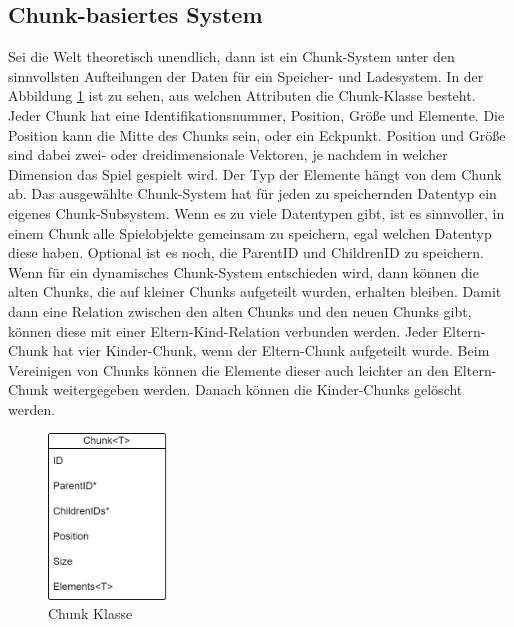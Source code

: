 \subsection{Chunk-basiertes System}
Sei die Welt theoretisch unendlich, dann ist ein Chunk-System unter den sinnvollsten Aufteilungen der Daten für ein Speicher- und Ladesystem. In der Abbildung \ref{fig:chunkClass} ist zu sehen, aus welchen Attributen die Chunk-Klasse besteht. Jeder Chunk hat eine Identifikationsnummer, Position, Größe und Elemente. Die Position kann die Mitte des Chunks sein, oder ein Eckpunkt. Position und Größe sind dabei zwei- oder dreidimensionale Vektoren, je nachdem in welcher Dimension das Spiel gespielt wird. Der Typ der Elemente hängt von dem Chunk ab. Das ausgewählte Chunk-System hat für jeden zu speichernden Datentyp ein eigenes Chunk-Subsystem. Wenn es zu viele Datentypen gibt, ist es sinnvoller, in einem Chunk alle Spielobjekte gemeinsam zu speichern, egal welchen Datentyp diese haben. Optional ist es noch, die ParentID und ChildrenID zu speichern. Wenn für ein dynamisches Chunk-System entschieden wird, dann können die alten Chunks, die auf kleiner Chunks aufgeteilt wurden, erhalten bleiben. Damit dann eine Relation zwischen den alten Chunks und den neuen Chunks gibt, können diese mit einer Eltern-Kind-Relation verbunden werden. Jeder Eltern-Chunk hat vier Kinder-Chunk, wenn der Eltern-Chunk aufgeteilt wurde. Beim Vereinigen von Chunks können die Elemente dieser auch leichter an den Eltern-Chunk weitergegeben werden. Danach können die Kinder-Chunks gelöscht werden.

\begin{figure}[htp]
    \centering
    \includegraphics[width=0.28\textwidth]{images/Chunk.png}
    \caption{Chunk Klasse}
    \label{fig:chunkClass}
\end{figure}

